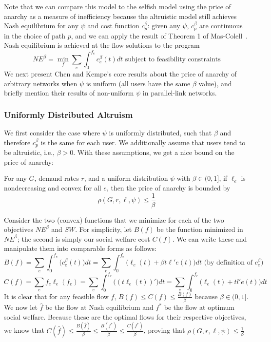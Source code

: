 Note that we can compare this model to the selfish model using the price of anarchy as a measure of inefficiency
because the altruistic model still achieves Nash equilibrium for any $\psi$ and cost function $c^\beta_p$: given any $\psi$, $c^\beta_p$ are continuous in the choice of path $p$, and we can apply the result of Theorem 1 of Mas-Colell~\cite{mascolell}. Nash equilibrium is achieved at the flow solutions to the program
$$NE^\beta = \min_f\sum_e\int_0^{f_e}c_e^\beta(t)dt \text{ subject to feasibility constraints}$$
We next present Chen and Kempe's core results about the price of anarchy of arbitrary networks when $\psi$ is uniform (all users have the same $\beta$ value), and briefly mention their results of non-uniform $\psi$ in parallel-link networks.

\subsubsection{Uniformly Distributed Altruism}
We first consider the case where $\psi$ is uniformly distributed, such that $\beta$ and therefore $c^\beta_p$ is the same for each user. We additionally assume that users tend to be altruistic, i.e., $\beta > 0$.
With these assumptions, we get a nice bound on the price of anarchy:
\begin{theorem}
For any $G$, demand rates $r$, and 
a uniform distribution $\psi$ with $\beta \in (0, 1]$,
if $\ell_e$ is nondecreasing and convex for all $e$, then the price of anarchy is bounded by 
    $$\rho(G,r,\ell,\psi) \le \frac{1}{\beta}$$
\end{theorem}

\begin{proof-sketch}
    Consider the two (convex) functions that we minimize for each of the two objectives $NE^\beta$ and $SW$. For simplicity, let $B(f)$ be the function minimized in $NE^\beta$; the second is simply our social welfare cost $C(f)$.
    We can write these and manipulate them into comparable forms as follows:
    $$B(f) = \sum_e\int_0^{{f}_e}\Big(c_e^\beta(t)\Big)dt = 
        \sum_e\int_0^{{f}_e} \Big(\ell_e(t) + \beta t\ell'e(t)\Big)dt\text{ (by definition of $c^\beta_e$)}$$
    $$C(f) = \sum_ef_e\ell_e(f_e) = \sum_e\int_0^{f_e} \Big((t\ell_e(t))' \Big)dt 
        = \sum_e\int_0^{f_e} \Big(\ell_e(t) + tl'e(t)\Big)dt$$ 
    It is clear that for any feasible flow $f$, 
    $B(f) \le C(f) \le \frac{B(f)}{\beta} \text{ because $\beta\in(0,1]$}$.
    We now let $\hat{f}$ be the flow at Nash equilibrium and $f^*$ be the flow at optimum social welfare. Because these are the optimal flows for their respective objectives, we know that 
    $C(\hat{f}) \le \frac{B(\hat{f})}{\beta} \le \frac{B(f^*)}{\beta} \le \frac{C(f^*)}{\beta}$,
    proving that 
    $\rho(G,r,\ell,\psi) \le \frac{1}{\beta}$
\end{proof-sketch}

